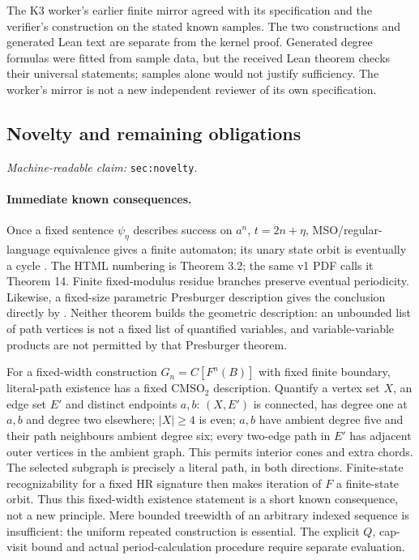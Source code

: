 \documentclass[11pt]{amsart}
\newcommand{\record}[1]{\nolinkurl{#1}}
\newcommand{\claimid}[1]{\par\nopagebreak\noindent\textit{Machine-readable claim:} \record{#1}.\par}
\theoremstyle{definition}\newtheorem{definition}{Definition}
\begin{document}
The K3 worker's earlier finite mirror agreed with its specification
and the verifier's construction on the stated known samples. The two
constructions and generated Lean text are separate from the kernel
proof. Generated degree formulas were fitted from sample data, but the
received Lean theorem checks their universal statements; samples alone
would not justify sufficiency. The worker's mirror is not a new
independent reviewer of its own specification.

\subsection{Novelty and remaining obligations}\label{sec:novelty}
\claimid{sec:novelty}
\paragraph{Immediate known consequences.}
Once a fixed sentence $\psi_\eta$ describes success on $a^n$,
$t=2n+\eta$, MSO/regular-language equivalence gives a finite automaton;
its unary state orbit is eventually a cycle \cite[Section 3.1]{MSO}.
The HTML numbering is Theorem 3.2; the same v1 PDF calls it Theorem 14.
Finite fixed-modulus residue branches preserve eventual periodicity.
Likewise, a fixed-size parametric Presburger description gives the
conclusion directly by \cite[Theorem 1.15]{BGW}. Neither theorem builds
the geometric description: an unbounded list of path vertices is not
a fixed list of quantified variables, and variable-variable products
are not permitted by that Presburger theorem.

For a fixed-width construction $G_n=C[F^n(B)]$ with fixed finite
boundary, literal-path existence has a fixed CMSO$_2$ description.
Quantify a vertex set $X$, an edge set $E'$ and distinct endpoints
$a,b$: $(X,E')$ is connected, has degree one at $a,b$ and degree two
elsewhere; $|X|\ge4$ is even; $a,b$ have ambient degree five and their
path neighbours ambient degree six; every two-edge path in $E'$ has
adjacent outer vertices in the ambient graph. This permits interior
cones and extra chords. The selected subgraph is precisely a literal
path, in both directions. Finite-state recognizability for a fixed
HR signature \cite[Chapter 1, Theorems 1.12 and 1.21(2)]{Courcelle}
then makes iteration of $F$ a finite-state orbit. Thus this fixed-width
existence statement is a short known consequence, not a new principle.
Mere bounded treewidth of an arbitrary indexed sequence is insufficient:
the uniform repeated construction is essential. The explicit $Q$,
cap-visit bound and actual period-calculation procedure require
separate evaluation.
\end{document}
